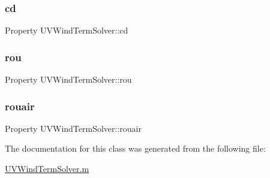 \subsubsection{\texorpdfstring{cd}{cd}}
{\footnotesize\ttfamily Property U\+V\+Wind\+Term\+Solver\+::cd}

\mbox{\label{class_u_v_wind_term_solver_aa94471ce04a95f8daf4d514a581f4fd4}} 
\subsubsection{\texorpdfstring{rou}{rou}}
{\footnotesize\ttfamily Property U\+V\+Wind\+Term\+Solver\+::rou}

\mbox{\label{class_u_v_wind_term_solver_aff0dfee0d18fb32e8a21e63f96fb1cc4}} 
\subsubsection{\texorpdfstring{rouair}{rouair}}
{\footnotesize\ttfamily Property U\+V\+Wind\+Term\+Solver\+::rouair}



The documentation for this class was generated from the following file\+:\begin{DoxyCompactItemize}
\item 
\hyperlink{_u_v_wind_term_solver_8m}{U\+V\+Wind\+Term\+Solver.\+m}\end{DoxyCompactItemize}
